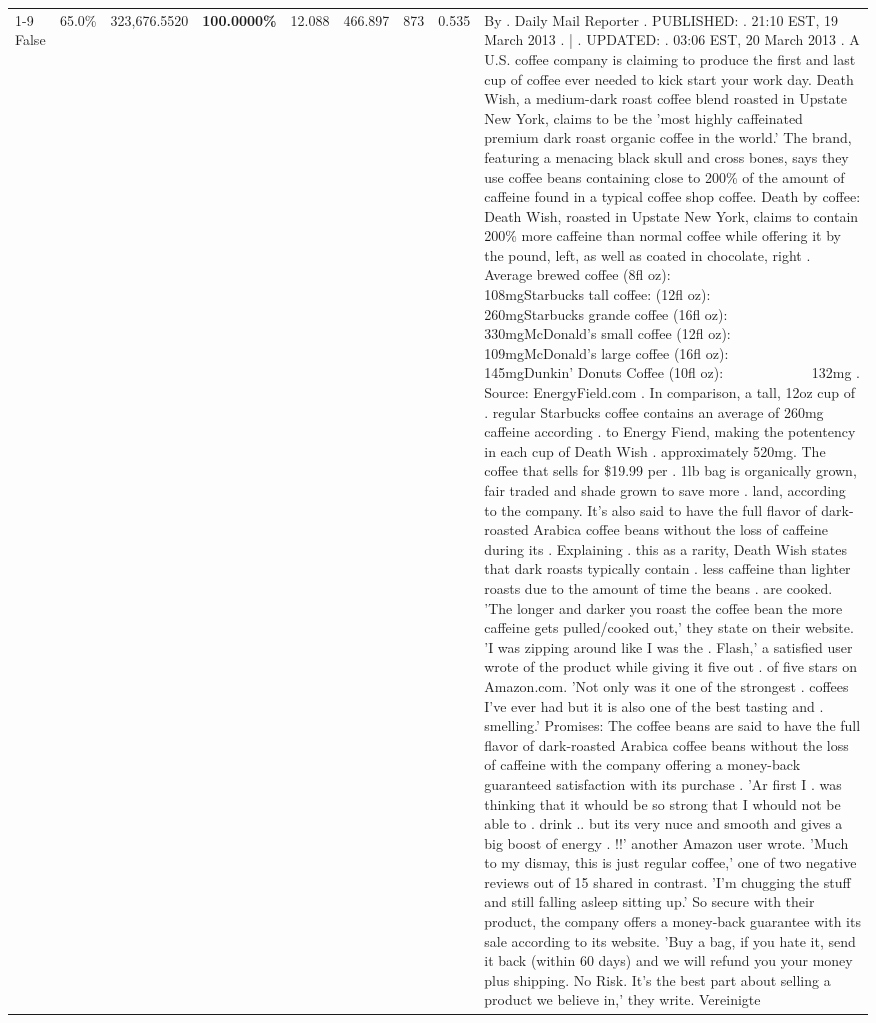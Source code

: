 \begin{table}[H]
{\begin{tabular}{lllrlllll}
\cline{1-9}
False & 65.0\% & 323,676.5520 & \bfseries \color{red} 100.0000\% & 12.088 & 466.897 & 873 & 0.535 & By . Daily Mail Reporter . PUBLISHED: . 21:10 EST, 19 March 2013 . | . UPDATED: . 03:06 EST, 20 March 2013 . A U.S. coffee company is claiming to produce the first and last cup of coffee ever needed to kick start your work day. Death Wish, a medium-dark roast coffee blend roasted in Upstate New York, claims to be the 'most highly caffeinated premium dark roast organic coffee in the world.' The brand, featuring a menacing black skull and cross bones, says they use coffee beans containing close to 200\% of the amount of caffeine found in a typical coffee shop coffee. Death by coffee: Death Wish, roasted in Upstate New York, claims to contain 200\% more caffeine than normal coffee while offering it by the pound, left, as well as coated in chocolate, right . Average brewed coffee (8fl oz):              108mgStarbucks tall coffee: (12fl oz):                260mgStarbucks grande coffee (16fl oz):         330mgMcDonald's small coffee (12fl oz):           109mgMcDonald's large coffee (16fl oz):           145mgDunkin' Donuts Coffee (10fl oz):             132mg . Source: EnergyField.com . In comparison, a tall, 12oz cup of . regular Starbucks coffee contains an average of 260mg caffeine according . to Energy Fiend, making the potentency in each cup of Death Wish . approximately 520mg. The coffee that sells for \$19.99 per . 1lb bag is organically grown, fair traded and shade grown to save more . land, according to the company. It's also said to have the full flavor of dark-roasted Arabica coffee beans without the loss of caffeine during its . Explaining . this as a rarity, Death Wish states that dark roasts typically contain . less caffeine than lighter roasts due to the amount of time the beans . are cooked. 'The longer and darker you roast the coffee bean the more caffeine gets pulled/cooked out,' they state on their website. 'I was zipping around like I was the . Flash,' a satisfied user wrote of the product while giving it five out . of five stars on Amazon.com. 'Not only was it one of the strongest . coffees I've ever had but it is also one of the best tasting and . smelling.’ Promises: The coffee beans are said to have the full flavor of dark-roasted Arabica coffee beans without the loss of caffeine with the company offering a money-back guaranteed satisfaction with its purchase . 'Ar first I . was thinking that it whould be so strong that I whould not be able to . drink .. but its very nuce and smooth and gives a big boost of energy . !!' another Amazon user wrote. 'Much to my dismay, this is just regular coffee,' one of two negative reviews out of 15 shared in contrast. 'I'm chugging the stuff and still falling asleep sitting up.' So secure with their product, the company offers a money-back guarantee with its sale according to its website. 'Buy a bag, if you hate it, send it back (within 60 days) and we will refund you your money plus shipping. No Risk. It’s the best part about selling a product we believe in,' they write. Vereinigte \\

\end{tabular}}
\end{table}
